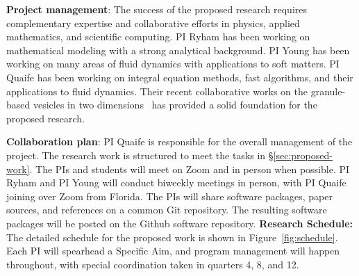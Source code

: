 \textbf{Project management}: 
%
The success of the proposed research requires complementary expertise
and collaborative efforts in physics, applied mathematics, and
scientific computing. PI Ryham has been working on mathematical modeling
with a strong analytical background. PI Young has been working on many
areas of fluid dynamics with applications to soft matters. 
PI Quaife has been working on integral equation methods,
fast algorithms, and their applications to fluid dynamics.  
Their recent collaborative works on the granule-based vesicles
in two dimensions~\cite{FuQuRyYo22, fu-ryh-qua-you2022} has provided a
solid foundation for the proposed research.

\smallskip

\textbf{Collaboration plan}: 
%
PI Quaife is responsible for the overall management of the project.
The research work is structured to meet the tasks
in \S\ref{sec:proposed-work}. The PIs and students will meet
on Zoom and in person when possible. PI Ryham and PI Young
will conduct biweekly meetings in person, with PI Quaife joining over
Zoom from Florida. The PIs will share software packages, paper sources,
and references on a common \textsf{Git} repository. The resulting
software packages will be posted on the \textsf{Github} software
repository.
%
%
\textbf{Research Schedule:} The detailed schedule for the proposed work
is shown in Figure~\ref{fig:schedule}. Each PI will spearhead a
Specific Aim, and program management will happen
throughout, with special coordination taken in quarters 4, 8, and
12.


